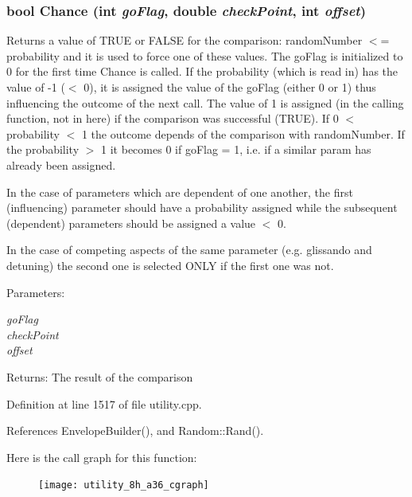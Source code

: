 \subsubsection{\setlength{\rightskip}{0pt plus 5cm}bool Chance (int {\em go\-Flag}, double {\em check\-Point}, int {\em offset})}\label{utility_8h_a36}


Returns a value of TRUE or FALSE for the comparison: random\-Number $<$= probability and it is used to force one of these values. The go\-Flag is initialized to 0 for the first time Chance is called. If the probability (which is read in) has the value of -1 ($<$ 0), it is assigned the value of the go\-Flag (either 0 or 1) thus influencing the outcome of the next call. The value of 1 is assigned (in the calling function, not in here) if the comparison was successful (TRUE). If 0 $<$ probability $<$ 1 the outcome depends of the comparison with random\-Number. If the probability $>$ 1 it becomes 0 if go\-Flag = 1, i.e. if a similar param has already been assigned.

In the case of parameters which are dependent of one another, the first (influencing) parameter should have a probability assigned while the subsequent (dependent) parameters should be assigned a value $<$ 0.

In the case of competing aspects of the same parameter (e.g. glissando and detuning) the second one is selected ONLY if the first one was not. \begin{Desc}
\item[Parameters:]
\begin{description}
\item[{\em go\-Flag}]\item[{\em check\-Point}]\item[{\em offset}]\end{description}
\end{Desc}
\begin{Desc}
\item[Returns:]The result of the comparison \end{Desc}


Definition at line 1517 of file utility.cpp.

References Envelope\-Builder(), and Random::Rand().

Here is the call graph for this function:\begin{figure}[H]
\begin{center}
\leavevmode
\texttt{[image: utility\_8h\_a36\_cgraph]}
\end{center}
\end{figure}
